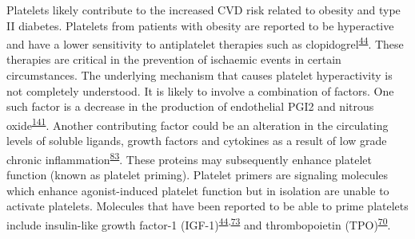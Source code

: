 \documentclass[11pt,twoside]{bristolthesis}
\begin{document}
Platelets likely contribute to the increased CVD risk related to obesity and type II diabetes. Platelets from patients with obesity are reported to be hyperactive and have a lower sensitivity to antiplatelet therapies such as clopidogrel\textsuperscript{\protect\hyperlink{ref-Nardin2015}{44}}. These therapies are critical in the prevention of ischaemic events in certain circumstances. The underlying mechanism that causes platelet hyperactivity is not completely understood. It is likely to involve a combination of factors. One such factor is a decrease in the production of endothelial PGI2 and nitrous oxide\textsuperscript{\protect\hyperlink{ref-BelindeChantemele2012a}{141}}. Another contributing factor could be an alteration in the circulating levels of soluble ligands, growth factors and cytokines as a result of low grade chronic inflammation\textsuperscript{\protect\hyperlink{ref-Esser2014}{83}}. These proteins may subsequently enhance platelet function (known as platelet priming). Platelet primers are signaling molecules which enhance agonist-induced platelet function but in isolation are unable to activate platelets. Molecules that have been reported to be able to prime platelets include insulin-like growth factor-1 (IGF-1)\textsuperscript{\protect\hyperlink{ref-Nardin2015}{44},\protect\hyperlink{ref-Blair2015}{73}} and thrombopoietin (TPO)\textsuperscript{\protect\hyperlink{ref-Maury2010a}{70}}.
\end{document}

